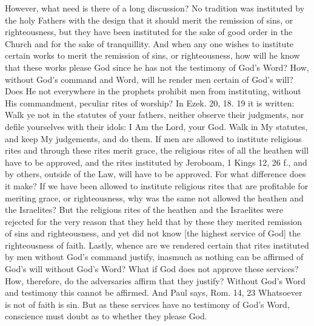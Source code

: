 However, what need is there of a long discussion?  No tradition was
instituted by the holy Fathers with the design that it should merit
the remission of sins, or righteousness, but they have been
instituted for the sake of good order in the Church and for the sake
of tranquillity.  And when any one wishes to institute certain works
to merit the remission of sins, or righteousness, how will he know
that these works please God since he has not the testimony of God's
Word?  How, without God's command and Word, will he render men
certain of God's will?  Does He not everywhere in the prophets
prohibit men from instituting, without His commandment, peculiar
rites of worship?  In Ezek. 20, 18. 19 it is written: Walk ye not in
the statutes of your fathers, neither observe their judgments, nor
defile yourselves with their idols: I Am the Lord, your God.  Walk in
My statutes, and keep My judgements, and do them.  If men are allowed
to institute religious rites and through these rites merit grace, the
religious rites of all the heathen will have to be approved, and the
rites instituted by Jeroboam, 1 Kings 12, 26 f., and by others,
outside of the Law, will have to be approved.  For what difference
does it make?  If we have been allowed to institute religious rites
that are profitable for meriting grace, or righteousness, why was the
same not allowed the heathen and the Israelites?  But the religious
rites of the heathen and the Israelites were rejected for the very
reason that they held that by these they merited remission of sins
and righteousness, and yet did not know [the highest service of God]
the righteousness of faith.  Lastly, whence are we rendered certain
that rites instituted by men without God's command justify, inasmuch
as nothing can be affirmed of God's will without God's Word?  What if
God does not approve these services?  How, therefore, do the
adversaries affirm that they justify?  Without God's Word and
testimony this cannot be affirmed.  And Paul says, Rom. 14, 23
Whatsoever is not of faith is sin.  But as these services have no
testimony of God's Word, conscience must doubt as to whether they
please God.

